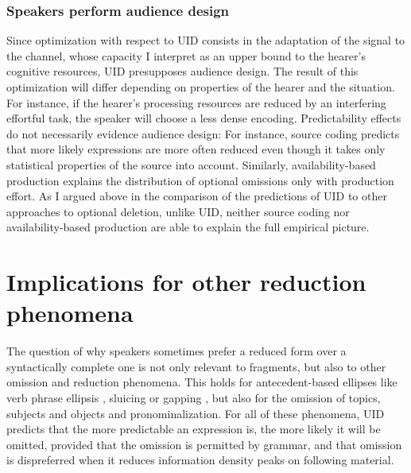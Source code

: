 \subsubsection{Speakers perform audience design}
Since optimization with respect to UID consists in the adaptation of the signal to the channel, whose capacity I interpret as an upper bound to the hearer's cognitive resources, UID presupposes audience design. The result of this optimization will differ depending on properties of the hearer and the situation. For instance, if the hearer's processing resources are reduced by an interfering effortful task, the speaker will choose a less dense encoding. Predictability effects do not necessarily evidence audience design: For instance, source coding predicts that more likely expressions are more often reduced even though it takes only statistical properties of the source into account. Similarly, availability-based production explains the distribution of optional omissions only with production effort. As I argued above in the comparison of the predictions of UID to other approaches to optional deletion, unlike UID, neither source coding nor availability-based production are able to explain the full empirical picture.

\section{Implications for other reduction phenomena}
The question of why speakers sometimes prefer a reduced form over a syntactically complete one is not only relevant to fragments, but also to other omission and reduction phenomena. This holds for antecedent-based ellipses like verb phrase ellipsis \citep{sag1976, williams1977}, sluicing \citep{ross1969} or gapping \citep{ross1970}, but also for the omission of topics, subjects and objects and pronominalization. For all of these phenomena, UID predicts that the more predictable an expression is, the more likely it will be omitted, provided that the omission is permitted by grammar, and that omission is dispreferred when it reduces information density peaks on following material.

